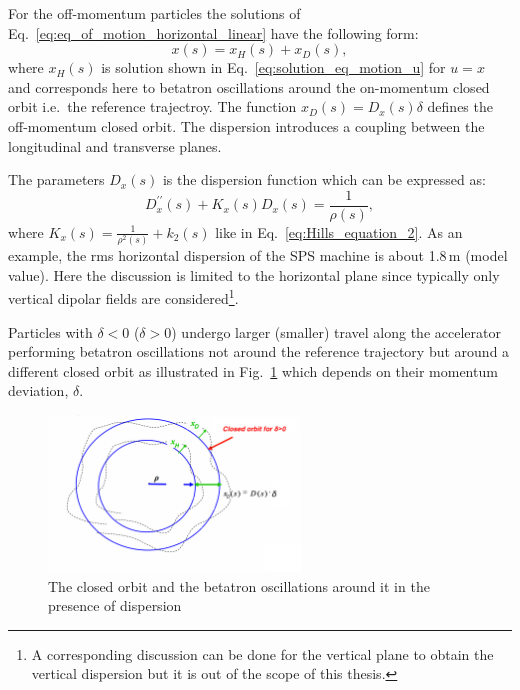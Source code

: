 For the off-momentum particles the solutions of Eq.~\eqref{eq:eq_of_motion_horizontal_linear} have the following form:
\begin{equation}
    x(s) = x_H(s) + x_D(s),
\end{equation}
where $x_H(s)$ is solution shown in Eq.~\eqref{eq:solution_eq_motion_u} for $u=x$ and corresponds here to betatron oscillations around the on-momentum closed orbit i.e.~the reference trajectroy. The function $x_D(s)=D_x(s) \delta$ defines the off-momentum closed orbit. The dispersion introduces a coupling between the longitudinal and transverse planes.

The parameters $D_x(s)$ is the dispersion function which can be expressed as:
\begin{equation}\label{eq:dispersion_function}
    D^{\prime \prime}_x(s) + K_x(s)D_x(s) = \frac{1}{\rho(s)},
\end{equation}
where $K_x(s)= \frac{1}{\rho^2(s)}+k_2(s)$ like in Eq.~\eqref{eq:Hills_equation_2}. As an example, the rms horizontal dispersion of the SPS machine is about 1.8\,m (model value). Here the discussion is limited to the horizontal plane since typically only vertical dipolar fields are considered\footnote{A corresponding discussion can be done for the vertical plane to obtain the vertical dispersion but it is out of the scope of this thesis.}.

Particles with $\delta < 0$ ($\delta>0$) undergo larger (smaller) travel along the accelerator performing betatron oscillations not around the reference trajectory but around a different closed orbit as illustrated in Fig.~\ref{fig:closed_orbit_Dx} which depends on their momentum deviation, $\delta$. 


\begin{figure}[!h] %
    \centering         
    \includegraphics[width=0.6\textwidth]{images/Ch2/closed_orbit_dispersion.png}
        \caption{The closed orbit and the betatron oscillations around it in the presence of dispersion~\cite{Holzer_summer_students_introduction}}
        \label{fig:closed_orbit_Dx}
 \end{figure}


